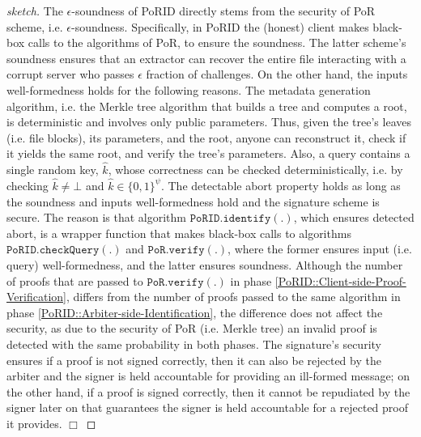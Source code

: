 \begin{proof}[sketch]
The $\epsilon$-soundness of PoRID directly stems from the security of PoR scheme, i.e. $\epsilon$-soundness. Specifically,
in PoRID the (honest) client makes black-box calls to the algorithms of PoR, to ensure the soundness. The latter scheme's soundness ensures that an extractor can recover the entire file interacting with a corrupt server who passes  $\epsilon$ fraction of challenges. On the other hand, the inputs well-formedness holds for the following reasons. The metadata generation algorithm, i.e. the Merkle tree algorithm that builds a tree and computes a root, is deterministic and involves only public  parameters. Thus, given the tree's leaves (i.e. file blocks), its parameters, and the root, anyone can reconstruct it, check if it yields the same root, and verify the tree's parameters. Also, a query contains a single random key, $\hat{k}$, whose correctness can be checked deterministically, i.e. by checking $\hat{k}\neq \bot$ and  $\hat{k}\in \{0,1\}^{\scriptscriptstyle\psi}$. The detectable abort property holds as long as the soundness and inputs well-formedness hold and the signature scheme is secure. The reason is that algorithm $\mathtt{PoRID.identify}(.)$, which ensures detected abort, is a wrapper function that makes black-box calls to algorithms $\mathtt{PoRID.checkQuery}(.)$ and $\mathtt{PoR.verify}(.)$, where the former  ensures input (i.e. query) well-formedness, and the latter  ensures soundness.  Although the number of proofs that are passed to $\mathtt{PoR.verify}(.)$ in phase \ref{PoRID::Client-side-Proof-Verification}, differs from the number of proofs passed to the same algorithm in phase \ref{PoRID::Arbiter-side-Identification}, the difference does not affect the security, as due to the security of PoR (i.e.  Merkle tree) an invalid proof is detected with the same probability in both phases. The signature’s security ensures if a proof is not signed correctly, then it can also be rejected by the arbiter and the signer is held accountable for providing an ill-formed message; on the other hand, if a proof is signed correctly, then it cannot be repudiated by the signer later on that guarantees the signer is held accountable for a rejected proof it provides. 
\hfill\(\Box\)\end{proof}











